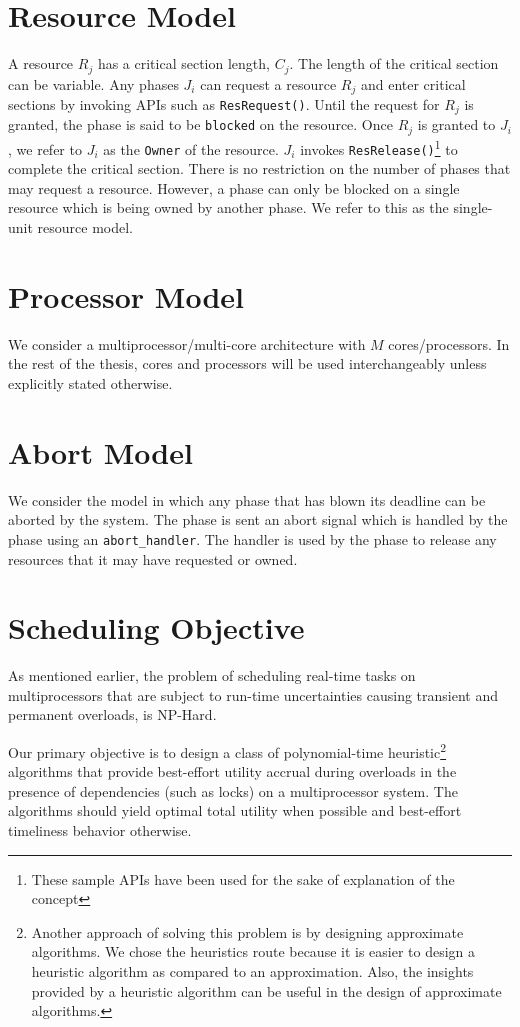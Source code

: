 \documentclass[12pt,dvips]{report}
\begin{document}
\section{Resource Model}
A resource $R_j$ has a critical section length, $C_j$. The length of the critical section can be variable. Any phases $J_i$ can request a resource $R_j$ and enter critical sections by invoking APIs such as \texttt{ResRequest()}. Until the request for $R_j$ is granted, the phase is said to be \texttt{blocked} on the resource. Once $R_j$ is granted to $J_i$, we refer to $J_i$ as the \texttt{Owner} of the resource. $J_i$ invokes \texttt{ResRelease()}\footnote{These sample APIs have been used for the sake of explanation of the concept} to complete the critical section. There is no restriction on the number of phases that may request a resource. However, a phase can only be blocked on a single resource which is being owned by another phase. We refer to this as the single-unit resource model.

\section{Processor Model}
We consider a multiprocessor/multi-core architecture with $M$ cores/processors. In the rest of the thesis, cores and processors will be used interchangeably unless explicitly stated otherwise.

\section{Abort Model}

We consider the model in which any phase that has blown its deadline can be aborted by the system. The phase is sent an abort signal which is handled by the phase using an \texttt{abort\_handler}. The handler is used by the phase to release any resources that it may have requested or owned.  

\section{Scheduling Objective}

As mentioned earlier, the problem of scheduling real-time tasks on multiprocessors that are subject to run-time uncertainties causing transient and permanent overloads, is NP-Hard.

Our primary objective is to design a class of polynomial-time heuristic\footnote{Another approach of solving this problem is by designing approximate algorithms. We chose the heuristics route because it is easier to design a heuristic algorithm as compared to an approximation. Also, the insights provided by a heuristic algorithm can be useful in the design of approximate algorithms.} algorithms that provide best-effort utility accrual during overloads in the presence of dependencies (such as locks) on a multiprocessor system. The algorithms should yield optimal total utility when possible and best-effort timeliness behavior otherwise.
\end{document}
